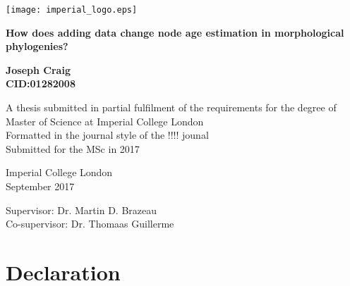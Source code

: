 \documentclass[11pt,letterpaper]{article}
\begin{document}
    \thispagestyle{empty}

    \begin{left}

    \texttt{[image: imperial\_logo.eps]}
    
    \end{left}
    
    \begin{center}    

        \vspace{1.5cm}

        \LARGE
        \textbf{How does adding data change node age estimation in morphological phylogenies?}
        
        
        \vspace{3.5cm}
        
        \Large
        \textbf{Joseph Craig\\
        CID:01282008}
         
        \vspace{1.5cm}
         
        \large
        A thesis submitted in partial fulfilment of the requirements for the degree of Master of Science at Imperial College London \\
        Formatted in the journal style of the !!!! jounal\\
        Submitted for the MSc in 2017\\
        
        \vspace{1.0cm}
                
        \large
        Imperial College London\\
        September 2017\\

        \vspace{1.0cm}

        \large
        Supervisor: Dr. Martin D. Brazeau \\
        Co-supervisor: Dr. Thomaas Guillerme \\
        
    \end{center}

\newpage

\section*{Declaration}
\end{document}
